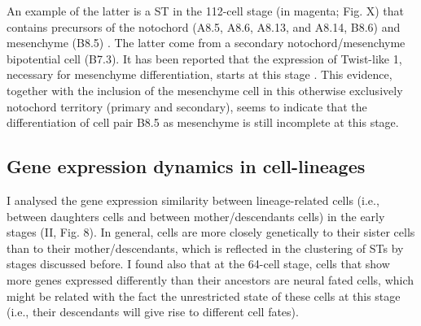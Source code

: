 An example of the latter is a ST in the 112-cell stage (in magenta; Fig. X) that contains   precursors of the notochord (A8.5, A8.6, A8.13, and A8.14, B8.6) and mesenchyme (B8.5) \citep{Tokuoka2004}.
The latter come from a secondary notochord/mesenchyme bipotential cell (B7.3). It has been reported that the expression of Twist-like 1, necessary for mesenchyme differentiation, starts at this stage \citep{Imai2003}.
This evidence, together with the inclusion of the mesenchyme cell in this otherwise exclusively notochord territory (primary and secondary), seems to indicate that the differentiation of cell pair B8.5 as mesenchyme is still incomplete at this stage.

\subsection{Gene expression dynamics in cell-lineages}

I analysed the gene expression similarity between lineage-related cells (i.e., between daughters cells and between mother/descendants cells) in the early stages (II, Fig. 8).
In general, cells are more closely genetically to their sister cells than to their mother/descendants, which is reflected in the clustering of STs by stages discussed before.
I found also that at the 64-cell stage, cells that show more genes expressed differently than
their ancestors are neural fated cells, which might be related with the fact the unrestricted state of these cells at this stage (i.e., their descendants will give rise to different cell fates).